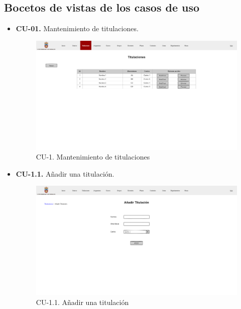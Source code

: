 \subsection{Bocetos de vistas de los casos de uso}
\begin{itemize}
	\item \textbf{CU-01.} Mantenimiento de titulaciones.
	\begin{figure}[!h]
		\centering
		\includegraphics[width=\textwidth]{../img/Anexos/Vistas/titulaciones.png}
		\caption{CU-1. Mantenimiento de titulaciones}\label{fig:../img/Anexos/Vistas/titulaciones.png}
	\end{figure}
	\newpage
	\item \textbf{CU-1.1.} Añadir una titulación.
	\begin{figure}[!h]
		\centering
		\includegraphics[width=\textwidth]{../img/Anexos/Vistas/add_titulacion.png}
		\caption{CU-1.1. Añadir una titulación}\label{fig:../img/Anexos/Vistas/add_titulacion.png}
	\end{figure}
	

\end{itemize}
